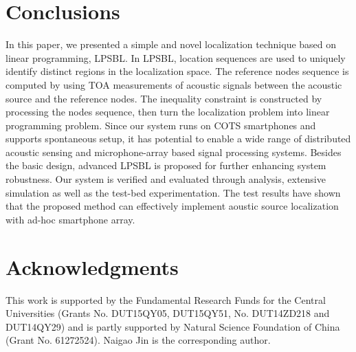 
\section{Conclusions}

In this paper, we presented a simple and novel localization technique based on linear programming, LPSBL. 
In LPSBL, location sequences are used to uniquely identify distinct regions in the localization space. 
The reference nodes sequence is computed by using TOA measurements of acoustic signals between the acoustic source and the reference nodes.
The inequality constraint is constructed by processing the nodes sequence, then turn the localization problem into linear programming problem. 
Since our system runs on COTS smartphones and supports spontaneous setup, 
 it has potential to enable a wide range of distributed acoustic sensing and microphone-array based signal processing systems. 
 Besides the basic design, advanced LPSBL is proposed for further enhancing system robustness.
 Our system is verified and evaluated through analysis, extensive simulation as well as the test-bed experimentation.
 The test results have shown that the proposed method can effectively implement aoustic source localization with ad-hoc smartphone array.

\section*{Acknowledgments}
This work is supported by the Fundamental Research Funds for the Central Universities (Grants No. DUT15QY05, DUT15QY51, No. DUT14ZD218 and DUT14QY29) and is partly supported by Natural Science Foundation of China (Grant No. 61272524).  Naigao Jin is the corresponding author.

